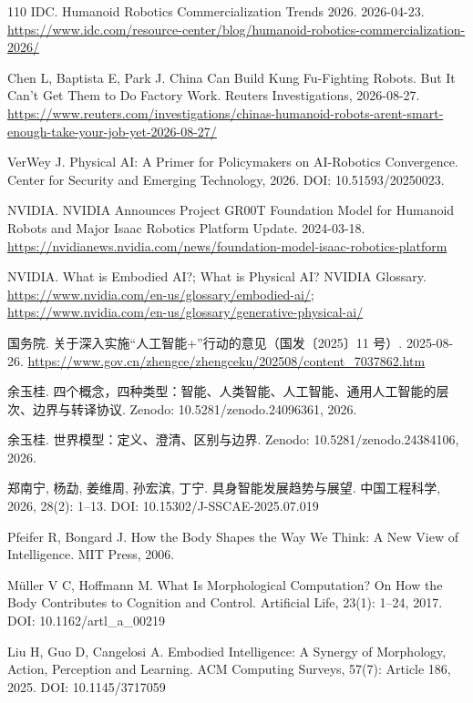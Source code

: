 \documentclass[10pt,fontset=fandol]{ctexart}
\begin{document}
\begin{thebibliography}{110}
IDC. Humanoid Robotics Commercialization Trends 2026. 2026-04-23. \url{https://www.idc.com/resource-center/blog/humanoid-robotics-commercialization-2026/}

Chen L, Baptista E, Park J. China Can Build Kung Fu-Fighting Robots. But It Can't Get Them to Do Factory Work. Reuters Investigations, 2026-08-27. \url{https://www.reuters.com/investigations/chinas-humanoid-robots-arent-smart-enough-take-your-job-yet-2026-08-27/}

VerWey J. Physical AI: A Primer for Policymakers on AI-Robotics Convergence. Center for Security and Emerging Technology, 2026. DOI: 10.51593/20250023.

NVIDIA. NVIDIA Announces Project GR00T Foundation Model for Humanoid Robots and Major Isaac Robotics Platform Update. 2024-03-18. \url{https://nvidianews.nvidia.com/news/foundation-model-isaac-robotics-platform}

NVIDIA. What is Embodied AI?; What is Physical AI? NVIDIA Glossary. \url{https://www.nvidia.com/en-us/glossary/embodied-ai/;} \url{https://www.nvidia.com/en-us/glossary/generative-physical-ai/}

国务院. 关于深入实施“人工智能+”行动的意见（国发〔2025〕11 号）. 2025-08-26. \url{https://www.gov.cn/zhengce/zhengceku/202508/content\_7037862.htm}

余玉桂. 四个概念，四种类型：智能、人类智能、人工智能、通用人工智能的层次、边界与转译协议. Zenodo: 10.5281/zenodo.24096361, 2026.

余玉桂. 世界模型：定义、澄清、区别与边界. Zenodo: 10.5281/zenodo.24384106, 2026.

郑南宁, 杨勐, 姜维周, 孙宏滨, 丁宁. 具身智能发展趋势与展望. 中国工程科学, 2026, 28(2): 1–13. DOI: 10.15302/J-SSCAE-2025.07.019

Pfeifer R, Bongard J. How the Body Shapes the Way We Think: A New View of Intelligence. MIT Press, 2006.

Müller V C, Hoffmann M. What Is Morphological Computation? On How the Body Contributes to Cognition and Control. Artificial Life, 23(1): 1–24, 2017. DOI: 10.1162/artl\_a\_00219

Liu H, Guo D, Cangelosi A. Embodied Intelligence: A Synergy of Morphology, Action, Perception and Learning. ACM Computing Surveys, 57(7): Article 186, 2025. DOI: 10.1145/3717059


\end{thebibliography}
\end{document}
